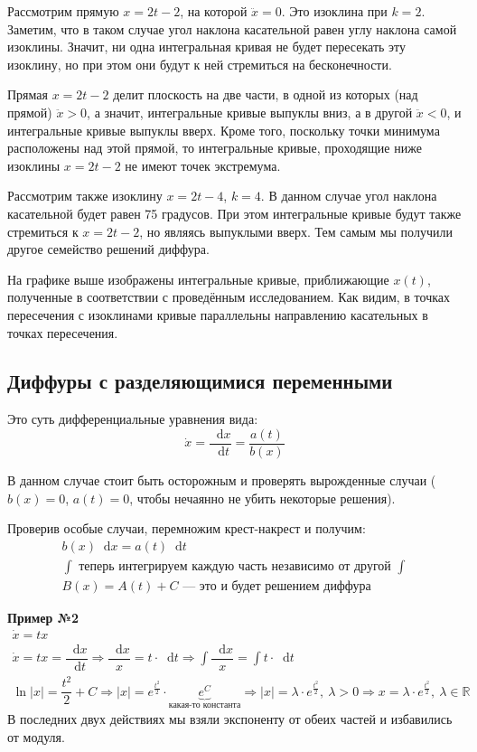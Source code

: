\documentclass[a4paper,12pt]{article}
\newcommand{\R}{\mathbb{R}}
\renewcommand*\d{\mathop{}\!\mathrm{d}}
\newcommand{\dx}{\dot{x}}
\newcommand{\ddx}{\ddot{x}}
\newcommand{\ds}{\displaystyle}
\begin{document}
Рассмотрим прямую $x = 2t - 2$, на которой $\ddx = 0$. Это изоклина при $k = 2$. Заметим, что в таком случае угол наклона касательной равен углу наклона самой изоклины. Значит, ни одна интегральная кривая не будет пересекать эту изоклину, но при этом они будут к ней стремиться на бесконечности.

Прямая $x = 2t - 2$ делит плоскость на две части, в одной из которых (над прямой) $\ddx > 0$, а значит, интегральные кривые выпуклы вниз, а в другой $\ddx < 0$, и интегральные кривые выпуклы вверх. Кроме того, поскольку точки минимума расположены над этой прямой, то интегральные кривые, проходящие ниже изоклины $x = 2t - 2$ не имеют точек экстремума. 

Рассмотрим также изоклину $x = 2t - 4$, $ k = 4$. В данном случае угол наклона касательной будет равен 75 градусов. При этом интегральные кривые будут также стремиться к $x = 2t - 2$, но являясь выпуклыми вверх. Тем самым мы получили другое семейство решений диффура.

На графике выше изображены интегральные кривые, приближающие $x(t)$, полученные в соответствии с проведённым исследованием. Как видим, в точках пересечения с изоклинами кривые параллельны направлению касательных в точках пересечения.


\subsection{Диффуры с разделяющимися переменными}

Это суть дифференциальные уравнения вида:
\[\dx = \dfrac{\d x}{\d t} = \dfrac{a(t)}{b(x)}\]

В данном случае стоит быть осторожным и проверять вырожденные случаи ($b(x) = 0$, $a(t) = 0$, чтобы нечаянно не убить некоторые решения).

Проверив особые случаи, перемножим крест-накрест и получим:
\begin{gather*}
	b(x)\d x = a(t)\d t \\
	\ds\int \text{ теперь интегрируем каждую часть независимо от другой } \ds\int\\
	B(x) = A(t) + C \text{ --- это и будет решением диффура}
\end{gather*}

\textbf{Пример №2}
\begin{gather*}
	\dx = tx \\
	\dx= tx = \dfrac{\d x}{\d t} \Longrightarrow \dfrac{\d x}{x} = t \cdot \d t \Longrightarrow \ds \int\dfrac{\d x}{x}=\int t \cdot \d t \\
	\ln |x| = \dfrac{t^2}{2} + C \Longrightarrow |x| = e^{\frac{t^2}{2}} \cdot \underbrace{e^C}_{\text{какая-то константа}} \Longrightarrow |x| = \lambda \cdot e^{\frac{t^2}{2}},\ \lambda > 0 \Longrightarrow x = \lambda \cdot e^{\frac{t^2}{2}},\ \lambda \in \R
\end{gather*}
В последних двух действиях мы взяли экспоненту от обеих частей и избавились от модуля.
\ \\
\end{document}

